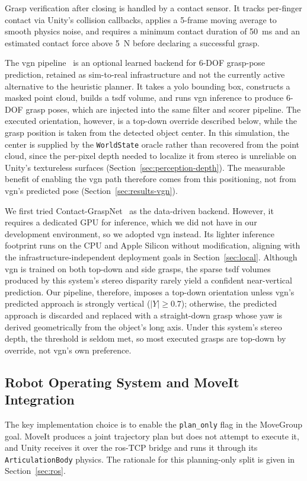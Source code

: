 Grasp verification after closing is handled by a contact sensor. It tracks per-finger contact via Unity’s collision callbacks, applies a 5-frame moving average to smooth physics noise, and requires a minimum contact duration of 50~ms and an estimated contact force above 5~N before declaring a successful grasp.

The \gls{vgn} pipeline~\cite{breyer2021volumetricgraspingnetworkrealtime} is an optional learned backend for 6-DOF grasp-pose prediction, retained as sim-to-real infrastructure and not the currently active alternative to the heuristic planner. It takes a \gls{yolo} bounding box, constructs a masked point cloud, builds a \gls{tsdf} volume, and runs \gls{vgn} inference to produce 6-DOF grasp poses, which are injected into the same filter and scorer pipeline. The executed orientation, however, is a top-down override described below, while the grasp position is taken from the detected object center. In this simulation, the center is supplied by the \texttt{WorldState} oracle rather than recovered from the point cloud, since the per-pixel depth needed to localize it from stereo is unreliable on Unity's textureless surfaces (Section~\ref{sec:perception-depth}). The measurable benefit of enabling the \gls{vgn} path therefore comes from this positioning, not from \gls{vgn}'s predicted pose (Section~\ref{sec:results-vgn}).

We first tried Contact-GraspNet~\cite{sundermeyer2021contactgraspnetefficient6dofgrasp} as the data-driven backend. However, it requires a dedicated GPU for inference, which we did not have in our development environment, so we adopted \gls{vgn} instead. Its lighter inference footprint runs on the CPU and Apple Silicon without modification, aligning with the infrastructure-independent deployment goals in Section~\ref{sec:local}. Although \gls{vgn} is trained on both top-down and side grasps, the sparse \gls{tsdf} volumes produced by this system’s stereo disparity rarely yield a confident near-vertical prediction. Our pipeline, therefore, imposes a top-down orientation unless \gls{vgn}'s predicted approach is strongly vertical ($|Y| \geq 0.7$); otherwise, the predicted approach is discarded and replaced with a straight-down grasp whose yaw is derived geometrically from the object’s long axis. Under this system’s stereo depth, the threshold is seldom met, so most executed grasps are top-down by override, not \gls{vgn}'s own preference.

\subsection{Robot Operating System and MoveIt Integration}\label{sec:ros_moveit}
The key implementation choice is to enable the \texttt{plan\_only} flag in the MoveGroup goal. MoveIt produces a joint trajectory plan but does not attempt to execute it, and Unity receives it over the \gls{ros}-TCP bridge and runs it through its \texttt{ArticulationBody} physics. The rationale for this planning-only split is given in Section~\ref{sec:ros}.

